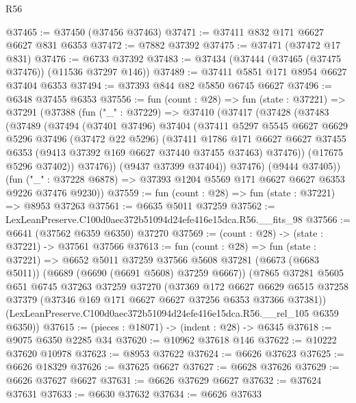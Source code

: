 \begin{lexlean}{R56}
\begin{coremodule}
@37465 := @37450 (@37456 @37463)
@37471 := @37411 @832 @171 @6627 @6627 @831 @6353
@37472 := @7882 @37392
@37475 := @37471 (@37472 @17 @831)
@37476 := @6733 @37392
@37483 := @37434 (@37444 (@37465 (@37475 @37476)) (@11536 @37297 @146))
@37489 := @37411 @5851 @171 @8954 @6627 @37404 @6353
@37494 := @37393 @844 @82 @5850 @6745 @6627
@37496 := @6348 @37455 @6353
@37556 := fun (count : @28) =>
  fun (state : @37221) =>
  @37291
    (@37388
      (fun ("_" : @37229) =>
      @37410
        (@37417
          (@37428
            (@37483
              (@37489
                (@37494
                  (@37401 @37496)
                  @37404
                  (@37411
                    @5297
                    @5545
                    @6627
                    @6629
                    @5296
                    @37496
                    (@37472 @22 @5296)
                    (@37411
                      @1786
                      @171
                      @6627
                      @6627
                      @37455
                      @6353
                      (@9413 @37392 @169 @6627 @37440 @37455 @37463)
                      @37476))
                  (@17675 @5296 @37402))
                @37476))
            (@9437 @37399 @37404))
          @37476)
        (@9444 @37405))
      (fun ("_" : @37228 @6878) => @37393 @1204 @5569 @171 @6627 @6627 @6353 @9226 @37476 @9230))
@37559 := fun (count : @28) => fun (state : @37221) => @8953 @37263
@37561 := @6635 @5011 @37259
@37562 := LexLeanPreserve.C100d0aec372b51094d24efe416e15dca.R56.__fits_98
@37566 := @6641 (@37562 @6359 @6350) @37270
@37569 := (count : @28) -> (state : @37221) -> @37561 @37566
@37613 := fun (count : @28) =>
  fun (state : @37221) =>
  @6652
    @5011
    @37259
    @37566
    @5608
    @37281
    (@6673 (@6683 @5011))
    (@6689 (@6690 (@6691 @5608) @37259 @6667))
    (@7865
      @37281
      @5605
      @651
      @6745
      @37263
      @37259
      @37270
      (@37369
        @172
        @6627
        @6629
        @6515
        @37258
        @37379
        (@37346 @169 @171 @6627 @6627 @37256 @6353 @37366 @37381))
      (LexLeanPreserve.C100d0aec372b51094d24efe416e15dca.R56.__rel_105 @6359 @6350))
@37615 := (pieces : @18071) -> (indent : @28) -> @6345
@37618 := @9075 @6350 @2285 @34
@37620 := @10962 @37618 @146
@37622 := @10222 @37620 @10978
@37623 := @8953 @37622
@37624 := @6626 @37623
@37625 := @6626 @18329
@37626 := @37625 @6627
@37627 := @6628 @37626
@37629 := @6626 @37627 @6627
@37631 := @6626 @37629 @6627
@37632 := @37624 @37631
@37633 := @6630 @37632
@37634 := @6626 @37633

\end{coremodule}
\end{lexlean}
